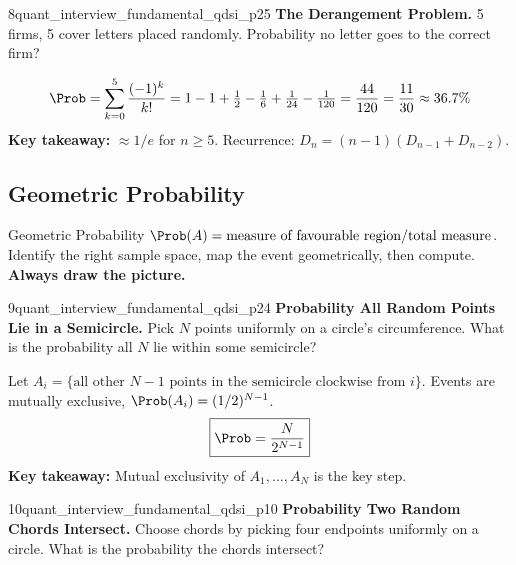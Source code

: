 \documentclass[11pt]{article}
\begin{document}
\begin{premiumproblem}{8}{\premiumlabel}{}{quant\_interview\_fundamental\_qdsi\_p25}
\textbf{The Derangement Problem.}
5 firms, 5 cover letters placed randomly. Probability no letter goes to the correct firm?
\end{premiumproblem}

\begin{solutionbox}
\[
  \Prob = \sum_{k=0}^{5}\frac{(-1)^k}{k!}
  = 1-1+\tfrac{1}{2}-\tfrac{1}{6}+\tfrac{1}{24}-\tfrac{1}{120}
  = \frac{44}{120}=\frac{11}{30}\approx36.7\%
\]
\textbf{Key takeaway:} $\approx1/e$ for $n\geq5$.
Recurrence: $D_n=(n-1)(D_{n-1}+D_{n-2})$.
\end{solutionbox}

\subsection{Geometric Probability}

\begin{techniquebox}{Geometric Probability}
$\Prob(A)=\text{measure of favourable region}/\text{total measure}$.
Identify the right sample space, map the event geometrically, then compute.
\textbf{Always draw the picture.}
\end{techniquebox}

\begin{premiumproblem}{9}{\premiumlabel}{}{quant\_interview\_fundamental\_qdsi\_p24}
\textbf{Probability All Random Points Lie in a Semicircle.}
Pick $N$ points uniformly on a circle's circumference. What is the probability
all $N$ lie within some semicircle?
\end{premiumproblem}

\begin{solutionbox}
Let $A_i=\{\text{all other }N-1\text{ points in the semicircle clockwise from }i\}$.
Events are mutually exclusive, $\Prob(A_i)=(1/2)^{N-1}$.
\[
  \boxed{\Prob = \frac{N}{2^{N-1}}}
\]
\textbf{Key takeaway:} Mutual exclusivity of $A_1,\ldots,A_N$ is the key step.
\end{solutionbox}

\begin{premiumproblem}{10}{\premiumlabel}{}{quant\_interview\_fundamental\_qdsi\_p10}
\textbf{Probability Two Random Chords Intersect.}
Choose chords by picking four endpoints uniformly on a circle. What is the
probability the chords intersect?
\end{premiumproblem}
\end{document}
